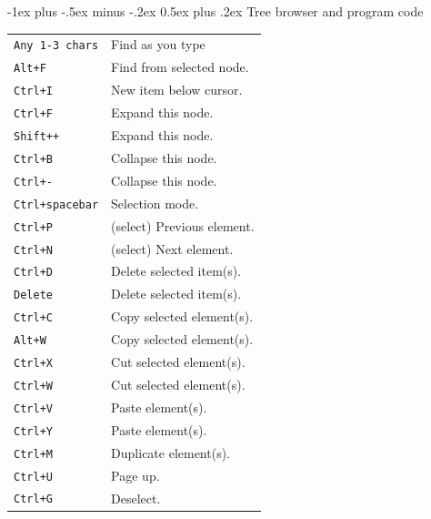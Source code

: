 \documentclass[10pt,landscape]{article}
\makeatletter
\renewcommand{\section}{\@startsection{section}{1}{0mm}%
                                {-1ex plus -.5ex minus -.2ex}%
                                {0.5ex plus .2ex}%
                                {\normalfont\large\bfseries}}
\makeatother
\begin{document}
\begin{multicols}{3}
\section{Tree browser and program code}
\newlength{\MyLen}
\begin{tabular}{@{}ll@{}}
\verb!Any 1-3 chars!    & Find as you type \\
\verb!Alt+F!  & Find from selected node. \\
\verb!Ctrl+I!    & New item below cursor. \\
\verb!Ctrl+F!  & Expand this node. \\
\verb!Shift++!  & Expand this node. \\
\verb!Ctrl+B!  & Collapse this node. \\
\verb!Ctrl+-!  & Collapse this node. \\
\verb!Ctrl+spacebar!  & Selection mode. \\
\verb!Ctrl+P!  & (select) Previous element. \\
\verb!Ctrl+N!  & (select) Next element. \\
\verb!Ctrl+D!  & Delete selected item(s). \\
\verb!Delete!  & Delete selected item(s). \\
\verb!Ctrl+C!  & Copy selected element(s). \\
\verb!Alt+W!  & Copy selected element(s). \\
\verb!Ctrl+X!  & Cut selected element(s). \\
\verb!Ctrl+W!  & Cut selected element(s). \\
\verb!Ctrl+V!  & Paste element(s). \\
\verb!Ctrl+Y!  & Paste element(s). \\
\verb!Ctrl+M!  & Duplicate element(s). \\
\verb!Ctrl+U!  & Page up. \\
\verb!Ctrl+G!  & Deselect. \\
\end{tabular}


\end{multicols}
\end{document}
